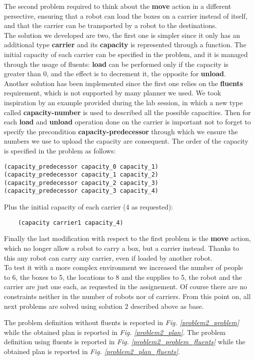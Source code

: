The second problem required to think about the \textbf{move} action in a different persective, 
ensuring that a robot can load the boxes on a carrier instead of itself, and that the carrier can be transported by a robot to the destinations.\\
The solution we developed are two, the first one is simpler since it only has an additional type \textbf{carrier} and its \textbf{capacity} is represented through a function.
The initial capacity of each carrier can be specified in the problem, and it is managed through the usage of fluents: \textbf{load} can be performed only if the capacity is greater than 0, and the effect is to decrement it, the opposite for \textbf{unload}.\\
Another solution has been implemented since the first one relies on the \textbf{fluents} requirement, which is not supported by many planner we used.
We took inspiration by an example provided during the lab session, in which a new type called \textbf{capacity-number} is used to described all the possible capacities.
Then for each \textbf{load} and \textbf{unload} operation done on the carrier is important not to forget to specify the precondition \textbf{capacity-predecessor} through which we ensure the numbers we use to upload the capacity are consequent.
The order of the capacity is specified in the problem as follows:
\begin{verbatim}
(capacity_predecessor capacity_0 capacity_1)
(capacity_predecessor capacity_1 capacity_2)
(capacity_predecessor capacity_2 capacity_3)
(capacity_predecessor capacity_3 capacity_4)
\end{verbatim}
Plus the initial capacity of each carrier (4 as requested):
\begin{verbatim}
    (capacity carrier1 capacity_4)
\end{verbatim}
Finally the last modification with respect to the first problem is the \textbf{move} action, which no longer allow a robot to carry a box, but a carrier instead.
Thanks to this any robot can carry any carrier, even if loaded by another robot.\\
To test it with a more complex environment we increased the number of people to 6, the boxes to 5, the locations to 8 and the supplies to 5, the robot and the carrier are just one each, as requested in the assignement.
Of course there are no constraints neither in the number of robots nor of carriers.
From this point on, all next problems are solved using solution 2 described above as base.

The problem definition without fluents is reported in \textit{Fig. \ref{problem2_problem}} while the obtained plan is reported in \textit{Fig. \ref{problem2_plan}}.
The problem definition using fluents is reported in \textit{Fig. \ref{problem2_problem_fluents}} while the obtained plan is reported in \textit{Fig. \ref{problem2_plan_fluents}}.